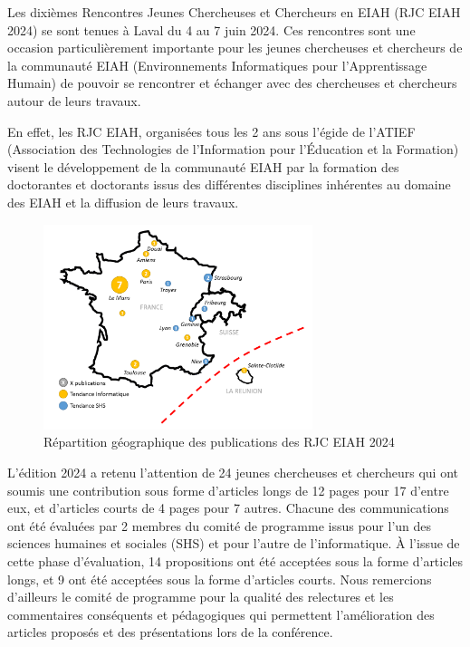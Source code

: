 Les dixièmes Rencontres Jeunes Chercheuses et Chercheurs en EIAH (RJC EIAH 2024) se sont tenues à Laval du 4 au 7 juin 2024. Ces rencontres sont une occasion particulièrement importante pour les jeunes chercheuses et chercheurs de la communauté EIAH (Environnements Informatiques pour l’Apprentissage Humain) de pouvoir se rencontrer et échanger avec des chercheuses et chercheurs autour de leurs travaux. 

En effet, les RJC EIAH, organisées tous les 2 ans sous l’égide de l’ATIEF (Association des Technologies de l'Information pour l'Éducation et la Formation) visent le développement de la communauté EIAH par la formation des doctorantes et doctorants issus des différentes disciplines inhérentes au domaine des EIAH et la diffusion de leurs travaux. 

\begin{figure}[!h]
	\centering
	\includegraphics[width=0.7\textwidth]{Content/figures/carteComplete.png}
	\caption{Répartition géographique des publications des RJC EIAH 2024}
	\label{f:repGeoPubli}
\end{figure}

L’édition 2024 a retenu l’attention de 24 jeunes chercheuses et chercheurs qui ont soumis une contribution sous forme d’articles longs de 12 pages pour 17 d’entre eux, et d'articles courts de 4 pages pour 7 autres. 
Chacune des communications ont été évaluées par 2 membres du comité de programme issus pour l'un des sciences humaines et sociales (SHS) et pour l'autre de l'informatique. À l’issue de cette phase d'évaluation, 14 propositions ont été acceptées sous la forme d’articles longs, et 9 ont été acceptées sous la forme d’articles courts. Nous remercions d'ailleurs le comité de programme pour la qualité  des relectures et les commentaires conséquents et pédagogiques qui permettent l’amélioration des articles proposés et des présentations lors de la conférence.

